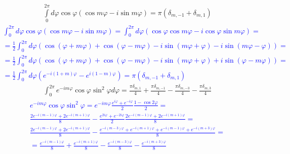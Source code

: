 %
\begin{equation} \begin{aligned} \label{eq:int_exp2}
\int \limits_{0}^{2\pi} d \varphi \cos \varphi 
( \cos m \varphi - i \sin m \varphi) = \pi ( \delta_{m,-1} + \delta_{m,1} )
\end{aligned} \end{equation}
%
\textcolor{blue}{ \begin{equation*} \begin{aligned}
\int_{0}^{2\pi} d \varphi \cos \varphi 
\left( \cos m \varphi - i \sin m \varphi \right) = \int_{0}^{2\pi} d \varphi
\left( \cos \varphi \cos m \varphi - i \cos \varphi \sin m \varphi \right) = \\
= \frac{1}{2} \int_{0}^{2\pi} d \varphi \left( 
\cos (\varphi + m \varphi) + \cos (\varphi - m \varphi) - 
i \sin (m \varphi + \varphi) - i \sin (m \varphi - \varphi) \right) = \\
= \frac{1}{2} \int_{0}^{2\pi} d \varphi \left( 
\cos (\varphi + m \varphi) + \cos (\varphi - m \varphi) - 
i \sin (m \varphi + \varphi) + i \sin (\varphi - m \varphi) \right) = \\
= \frac{1}{2} \int_{0}^{2\pi} d \varphi 
\left( e^{-i (1 + m) \varphi} - e^{i (1 - m) \varphi} \right) = 
\pi \left( \delta_{m,-1} + \delta_{m,1} \right)
\end{aligned} \end{equation*} }
%
\begin{equation} \begin{aligned} \label{eq:int_exp3}
\int_0^{2\pi} e^{-i m \varphi} \cos \varphi \sin^2 \varphi d \varphi = 
\frac{\pi \delta_{m,1} }{4} + \frac{\pi \delta_{m,-1} }{4} - 
\frac{\pi \delta_{m,-3} }{4} - \frac{\pi \delta_{m,3} }{4}
\end{aligned} \end{equation}
%
\textcolor{blue}{ \begin{equation*} \begin{aligned}
e^{-i m \varphi} \cos \varphi \sin^2 \varphi = e^{-i m \varphi} 
\frac{e^{i\varphi} + e^{-i\varphi}}{2} \frac{1 - \cos 2\varphi}{2} = \\
\frac{2e^{-i(m-1)\varphi} + 2e^{-i(m+1)\varphi}}{8} - 
\frac{e^{2i\varphi} + e^{-2i\varphi}}{2} 
\frac{2e^{-i(m-1)\varphi} + 2e^{-i(m+1)\varphi}}{8} = \\
\frac{2e^{-i(m-1)\varphi} + 2e^{-i(m+1)\varphi}}{8} - 
\frac{e^{-i(m-3)\varphi} + e^{-i(m+1)\varphi} + 
e^{-i(m-1)\varphi} + e^{-i(m+3)\varphi}}{8} = \\
= \frac{e^{-i(m-1)\varphi}}{8} + \frac{e^{-i(m+1)\varphi}}{8} -
\frac{e^{-i(m-3)\varphi}}{8} - \frac{e^{-i(m+3)\varphi}}{8}
\end{aligned} \end{equation*} }
